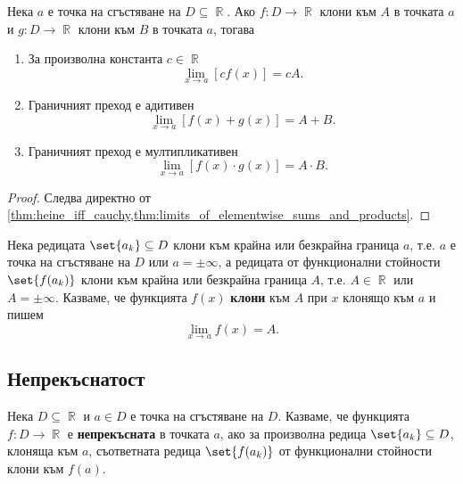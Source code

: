 \documentclass{../../common/topic}
\begin{document}
\begin{proposition}\label{thm:limit_is_linear_and_multiplicative}
  Нека \( a \) е точка на сгъстяване на \( D \subseteq \BbbR \). Ако \( f: D \to \BbbR \) клони към \( A \) в точката \( a \) и \( g: D \to \BbbR \) клони към \( B \) в точката \( a \), тогава
  \begin{enumerate}
    \item За произволна константа \( c \in \BbbR \)
    \begin{equation*}
      \lim_{x \to a} [c f(x)] = c A.
    \end{equation*}

    \item Граничният преход е адитивен
    \begin{equation*}
      \lim_{x \to a} [f(x) + g(x)] = A + B.
    \end{equation*}

    \item Граничният преход е мултипликативен
    \begin{equation*}
      \lim_{x \to a} [f(x) \cdot g(x)] = A \cdot B.
    \end{equation*}
  \end{enumerate}
\end{proposition}
\begin{proof}
  Следва директно от \cref{thm:heine_iff_cauchy,thm:limits_of_elementwise_sums_and_products}.
\end{proof}

\begin{definition}
  Нека редицата \( \set{ a_k } \subseteq D \) клони към крайна или безкрайна граница \( a \), т.е. \( a \) е точка на сгъстяване на \( D \) или \( a = \pm \infty \), а редицата от функционални стойности \( \set{ f(a_k) } \) клони към крайна или безкрайна граница \( A \), т.е. \( A \in \BbbR \) или \( A = \pm \infty \). Казваме, че функцията \( f(x) \) \textbf{клони} към \( A \) при \( x \) клонящо към \( a \) и пишем
  \begin{equation*}
    \lim_{x \to a} f(x) = A.
  \end{equation*}
\end{definition}

\subsection{Непрекъснатост}

\begin{definition}
  Нека \( D \subseteq \BbbR \) и \( a \in D \) е точка на сгъстяване на \( D \). Казваме, че функцията \( f: D \to \BbbR \) е \textbf{непрекъсната} в точката \( a \), ако за произволна редица \( \set{ a_k } \subseteq D \), клоняща към \( a \), съответната редица \( \set{ f(a_k) } \) от функционални стойности клони към \( f(a) \).
\end{definition}
\end{document}
